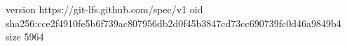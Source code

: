 version https://git-lfs.github.com/spec/v1
oid sha256:cce2f4910fe5b6f739ac807956db2d0f45b3847cd73cc690739fc0d46a9849b4
size 5964
